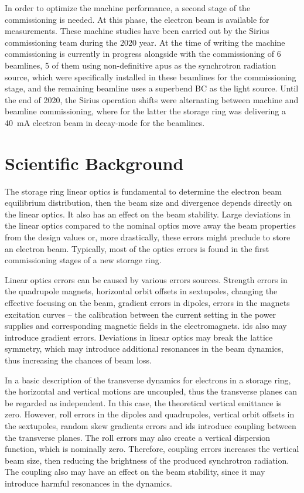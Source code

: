 In order to optimize the machine performance, a second stage of the commissioning is needed. At this phase, the electron beam is available for measurements. These machine studies have been carried out by the Sirius commissioning team during the 2020 year. At the time of writing the machine commissioning is currently in progress alongside with the commissioning of 6 beamlines, 5 of them using non-definitive \glspl{apu} as the synchrotron radiation source, which were specifically installed in these beamlines for the commissioning stage, and the remaining beamline uses a superbend BC as the light source. Until the end of 2020, the Sirius operation shifts were alternating between machine and beamline commissioning, where for the latter the storage ring was delivering a \SI{40}{\milli\ampere} electron beam in decay-mode for the beamlines.
\section{Scientific Background}\label{sec:background}
The storage ring linear optics is fundamental to determine the electron beam equilibrium distribution, then the beam size and divergence depends directly on the linear optics. It also has an effect on the beam stability. Large deviations in the linear optics compared to the nominal optics move away the beam properties from the design values or, more drastically, these errors might preclude to store an electron beam. Typically, most of the optics errors is found in the first commissioning stages of a new storage ring.

Linear optics errors can be caused by various errors sources. Strength errors in the quadrupole magnets, horizontal orbit offsets in sextupoles, changing the effective focusing on the beam, gradient errors in dipoles, errors in the magnets excitation curves -- the calibration between the current setting in the power supplies and corresponding magnetic fields in the electromagnets. \glspl{id} also may introduce gradient errors. Deviations in linear optics may break the lattice symmetry, which may introduce additional resonances in the beam dynamics, thus increasing the chances of beam loss.

In a basic description of the transverse dynamics for electrons in a storage ring, the horizontal and vertical motions are uncoupled, thus the transverse planes can be regarded as independent. In this case, the theoretical vertical emittance is zero. However, roll errors in the dipoles and quadrupoles, vertical orbit offsets in the sextupoles, random skew gradients errors and \glspl{id} introduce coupling between the transverse planes. The roll errors may also create a vertical dispersion function, which is nominally zero. Therefore, coupling errors increases the vertical beam size, then reducing the brightness of the produced synchrotron radiation. The coupling also may have an effect on the beam stability, since it may introduce harmful resonances in the dynamics.


